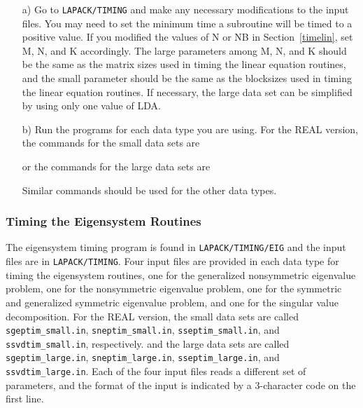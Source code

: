 \documentclass[11pt]{report}
\begin{document}
\begin{itemize}

\item[a)]
Go to \texttt{LAPACK/TIMING} and
make any necessary modifications to the input files.
You may need to set the minimum time a subroutine will
be timed to a positive value.
If you modified the values of N or NB
in Section~\ref{timelin}, set M, N, and K accordingly.
The large parameters among M, N, and K
should be the same as the matrix sizes used in timing the linear
equation routines,
and the small parameter should be the same as the
blocksizes used in timing the linear equation routines.
If necessary, the large data set can be simplified by using only one
value of LDA.

\item[b)]
Run the programs for each data type you are using.
For the REAL version, the commands for the small data sets are

or the commands for the large data sets are

\noindent
Similar commands should be used for the other data types.
\end{itemize}

\subsubsection{Timing the Eigensystem Routines}\label{timeeig}

The eigensystem timing program is found in \texttt{LAPACK/TIMING/EIG}
and the input files are in \texttt{LAPACK/TIMING}.
Four input files are provided in each data type for timing the
eigensystem routines,
one for the generalized nonsymmetric eigenvalue problem,
one for the nonsymmetric eigenvalue problem,
one for the symmetric and generalized symmetric eigenvalue problem,
and one for the singular value decomposition.
For the REAL version, the small data sets are called \texttt{sgeptim\_small.in},
\texttt{sneptim\_small.in}, \texttt{sseptim\_small.in}, and \texttt{ssvdtim\_small.in}, respectively.
and the large data sets are called \texttt{sgeptim\_large.in}, \texttt{sneptim\_large.in},
\texttt{sseptim\_large.in}, and \texttt{ssvdtim\_large.in}.
Each of the four input files reads a different set of parameters,
and the format of the input is indicated by a 3-character code
on the first line.
\end{document}
